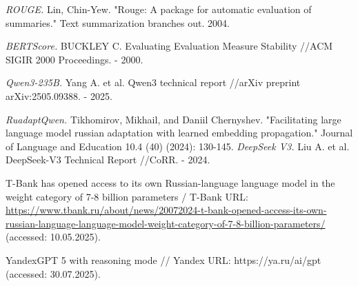 \documentclass{superfri}
\begin{document}
\begin{thebibliography}{99}
\textit{ROUGE.}
Lin, Chin-Yew. "Rouge: A package for automatic evaluation of summaries." Text summarization branches out. 2004.

\textit{BERTScore.}
BUCKLEY C. Evaluating Evaluation Measure Stability //ACM SIGIR 2000 Proceedings. - 2000.

\textit{Qwen3-235B.}
Yang A. et al. Qwen3 technical report //arXiv preprint arXiv:2505.09388. - 2025.

\textit{RuadaptQwen.}
Tikhomirov, Mikhail, and Daniil Chernyshev. "Facilitating large language model russian adaptation with learned embedding propagation." Journal of Language and Education 10.4 (40) (2024): 130-145.
\textit{DeepSeek V3.}
Liu A. et al. DeepSeek-V3 Technical Report //CoRR. - 2024.

T-Bank has opened access to its own Russian-language language model in the weight category of 7-8 billion parameters / T-Bank URL: \url{https://www.tbank.ru/about/news/20072024-t-bank-opened-access-its-own-russian-language-language-model-weight-category-of-7-8-billion-parameters/} (accessed: 10.05.2025).

YandexGPT 5 with reasoning mode // Yandex URL: https://ya.ru/ai/gpt (accessed: 30.07.2025).

\end{thebibliography}
\end{document}
